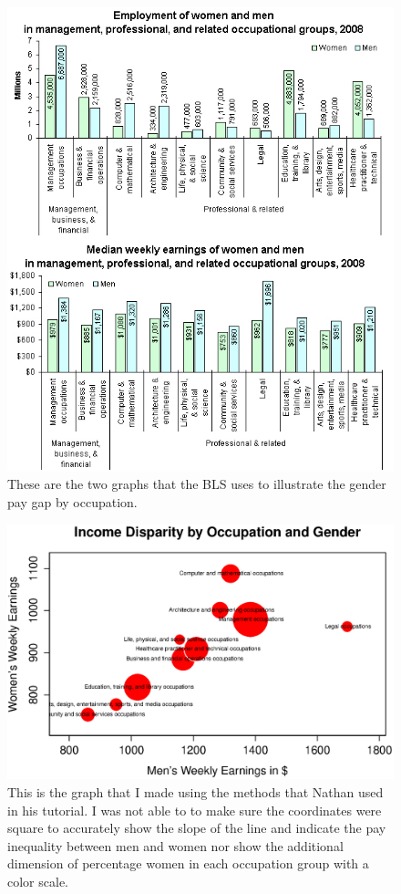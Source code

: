 \documentclass{article}
\begin{document}
\begin{figure}[H]
\begin{center}
\includegraphics[width=1\columnwidth]{bls_graph.jpg}
\caption{These are the two graphs that the BLS uses to illustrate the gender pay gap by occupation.}
\end{center}
\end{figure}



\begin{figure}[H]
\begin{center}
\includegraphics[width=1\columnwidth]{gender_old.eps}
\caption{This is the graph that I made using the methods that Nathan used in his tutorial.  I was not able to to make sure the coordinates were square to accurately show the slope of the line and indicate the pay inequality between men and women nor show the additional dimension of percentage women in each occupation group with a color scale.}
\end{center}
\end{figure}
\end{document}
